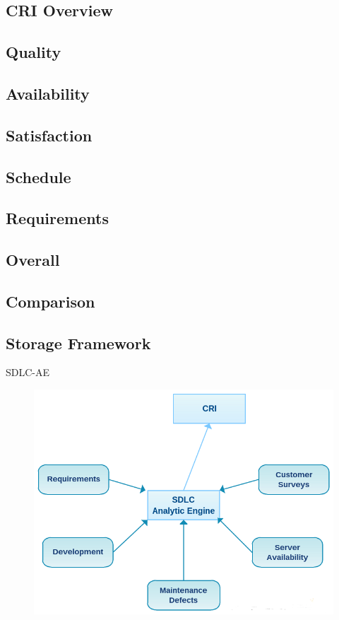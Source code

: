     \subsection{CRI Overview}
    \subsection{Quality}
    \subsection{Availability}
    \subsection{Satisfaction}
    \subsection{Schedule}
    \subsection{Requirements}
    \subsection{Overall}

    \subsection{Comparison}
    
    \subsection{Storage Framework}
        \begin{frame}{SDLC-AE}
            \begin{figure}[ht]
                \centering
                \includegraphics[scale=.5]{images/sdlcae.png}
            \end{figure}
        \end{frame}

